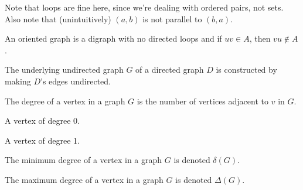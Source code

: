 \documentclass{article}
\begin{document}
    Note that loops are fine here, since we're dealing with ordered pairs, not sets.
    Also note that (unintuitively) $(a,b)$ is not parallel to $(b,a)$.

\medskip
{}

    An oriented graph is a digraph with no directed loops and if $uv \in A$, then $vu \notin A$.

\medskip
{}

    The underlying undirected graph $G$ of a directed graph $D$ is constructed by making $D$'s edges undirected.

\medskip
{}

    The degree of a vertex in a graph $G$ is the number of vertices adjacent to $v$ in $G$.

\medskip
{}

    A vertex of degree 0.

\medskip
{}

    A vertex of degree 1.

\medskip
{}

    The minimum degree of a vertex in a graph $G$ is denoted $\delta(G)$.

    The maximum degree of a vertex in a graph $G$ is denoted $\Delta(G)$.
\end{document}
